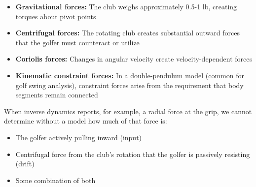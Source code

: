 \documentclass[11pt,a4paper]{article}
\theoremstyle{definition}
\theoremstyle{plain}
\begin{document}
\begin{itemize}
    \item \textbf{Gravitational forces:} The club weighs approximately 0.5-1 lb, creating torques about pivot points
    
    \item \textbf{Centrifugal forces:} The rotating club creates substantial outward forces that the golfer must counteract or utilize
    
    \item \textbf{Coriolis forces:} Changes in angular velocity create velocity-dependent forces
    
    \item \textbf{Kinematic constraint forces:} In a double-pendulum model (common for golf swing analysis), constraint forces arise from the requirement that body segments remain connected
\end{itemize}

When inverse dynamics reports, for example, a radial force at the grip, we cannot determine without a model how much of that force is:
\begin{itemize}
    \item The golfer actively pulling inward (input)
    \item Centrifugal force from the club's rotation that the golfer is passively resisting (drift)
    \item Some combination of both
\end{itemize}
\end{document}
